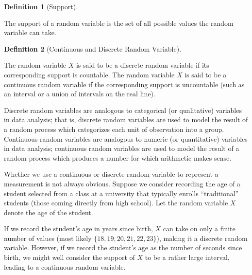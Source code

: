 \documentclass[
  letterpaper,
  DIV=11,
  numbers=noendperiod]{scrreprt}
\theoremstyle{definition}
\newtheorem{definition}{Definition}[chapter]
\theoremstyle{plain}
\theoremstyle{definition}
\theoremstyle{remark}
\begin{document}
\begin{definition}[Support]\protect\hypertarget{def-support}{}\label{def-support}

The support of a random variable is the set of all possible values the
random variable can take.

\end{definition}

\begin{definition}[Continuous and Discrete Random
Variable]\protect\hypertarget{def-rvtypes}{}\label{def-rvtypes}

The random variable \(X\) is said to be a discrete random variable if
its corresponding support is countable. The random variable \(X\) is
said to be a continuous random variable if the corresponding support is
uncountable (such as an interval or a union of intervals on the real
line).

\end{definition}

Discrete random variables are analogous to categorical (or qualitative)
variables in data analysis; that is, discrete random variables are used
to model the result of a random process which categorizes each unit of
observation into a group. Continuous random variables are analogous to
numeric (or quantitative) variables in data analysis; continuous random
variables are used to model the result of a random process which
produces a number for which arithmetic makes sense.

\begin{tcolorbox}[enhanced jigsaw, rightrule=.15mm, leftrule=.75mm, opacityback=0, coltitle=black, bottomrule=.15mm, opacitybacktitle=0.6, left=2mm, colframe=quarto-callout-warning-color-frame, breakable, colback=white, arc=.35mm, toprule=.15mm, toptitle=1mm, bottomtitle=1mm, title=\textcolor{quarto-callout-warning-color}{\faExclamationTriangle}\hspace{0.5em}{Warning}, titlerule=0mm, colbacktitle=quarto-callout-warning-color!10!white]

Whether we use a continuous or discrete random variable to represent a
measurement is not always obvious. Suppose we consider recording the age
of a student selected from a class at a university that typically
enrolls ``traditional'' students (those coming directly from high
school). Let the random variable \(X\) denote the age of the student.

If we record the student's age in years since birth, \(X\) can take on
only a finite number of values (most likely
\(\{18, 19, 20, 21, 22, 23\}\)), making it a discrete random variable.
However, if we record the student's age as the number of seconds since
birth, we might well consider the support of \(X\) to be a rather large
interval, leading to a continuous random variable.

\end{tcolorbox}
\end{document}
